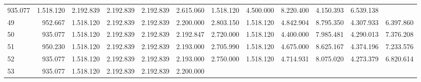 \begin{tabular}{llllllllllll}
  \multicolumn{1}{|r}{935.077} &
  \multicolumn{1}{r}{1.518.120} &
  \multicolumn{1}{r}{2.192.839} &
  \multicolumn{1}{r}{2.192.839} &
  \multicolumn{1}{r}{2.192.839} &
  \multicolumn{1}{r}{2.615.060} &
  \multicolumn{1}{r}{1.518.120} &
  \multicolumn{1}{r}{4.500.000} &
  \multicolumn{1}{r}{8.220.400} &
  \multicolumn{1}{r}{4.150.393} &
  \multicolumn{1}{r}{6.539.138} \\
\multicolumn{1}{l}{\hspace{1em}49} &
  \multicolumn{1}{|r}{952.667} &
  \multicolumn{1}{r}{1.518.120} &
  \multicolumn{1}{r}{2.192.839} &
  \multicolumn{1}{r}{2.192.839} &
  \multicolumn{1}{r}{2.200.000} &
  \multicolumn{1}{r}{2.803.150} &
  \multicolumn{1}{r}{1.518.120} &
  \multicolumn{1}{r}{4.842.904} &
  \multicolumn{1}{r}{8.795.350} &
  \multicolumn{1}{r}{4.307.933} &
  \multicolumn{1}{r}{6.397.860} \\
\multicolumn{1}{l}{\hspace{1em}50} &
  \multicolumn{1}{|r}{935.077} &
  \multicolumn{1}{r}{1.518.120} &
  \multicolumn{1}{r}{2.192.839} &
  \multicolumn{1}{r}{2.192.839} &
  \multicolumn{1}{r}{2.192.847} &
  \multicolumn{1}{r}{2.720.000} &
  \multicolumn{1}{r}{1.518.120} &
  \multicolumn{1}{r}{4.400.000} &
  \multicolumn{1}{r}{7.985.481} &
  \multicolumn{1}{r}{4.290.013} &
  \multicolumn{1}{r}{7.376.208} \\
\multicolumn{1}{l}{\hspace{1em}51} &
  \multicolumn{1}{|r}{950.230} &
  \multicolumn{1}{r}{1.518.120} &
  \multicolumn{1}{r}{2.192.839} &
  \multicolumn{1}{r}{2.192.839} &
  \multicolumn{1}{r}{2.193.000} &
  \multicolumn{1}{r}{2.705.990} &
  \multicolumn{1}{r}{1.518.120} &
  \multicolumn{1}{r}{4.675.000} &
  \multicolumn{1}{r}{8.625.167} &
  \multicolumn{1}{r}{4.374.196} &
  \multicolumn{1}{r}{7.233.576} \\
\multicolumn{1}{l}{\hspace{1em}52} &
  \multicolumn{1}{|r}{935.077} &
  \multicolumn{1}{r}{1.518.120} &
  \multicolumn{1}{r}{2.192.839} &
  \multicolumn{1}{r}{2.192.839} &
  \multicolumn{1}{r}{2.193.000} &
  \multicolumn{1}{r}{2.750.000} &
  \multicolumn{1}{r}{1.518.120} &
  \multicolumn{1}{r}{4.714.931} &
  \multicolumn{1}{r}{8.075.020} &
  \multicolumn{1}{r}{4.273.379} &
  \multicolumn{1}{r}{6.820.614} \\
\multicolumn{1}{l}{\hspace{1em}53} &
  \multicolumn{1}{|r}{935.077} &
  \multicolumn{1}{r}{1.518.120} &
  \multicolumn{1}{r}{2.192.839} &
  \multicolumn{1}{r}{2.192.839} &
  \multicolumn{1}{r}{2.200.000} &

\end{tabular}
